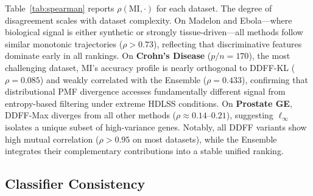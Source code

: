 \documentclass[conference]{IEEEtran}
\begin{document}
Table~\ref{tab:spearman} reports $\rho(\text{MI}, \cdot)$ for each dataset. The degree of disagreement scales with dataset complexity. On Madelon and Ebola---where biological signal is either synthetic or strongly tissue-driven---all methods follow similar monotonic trajectories ($\rho > 0.73$), reflecting that discriminative features dominate early in all rankings. On \textbf{Crohn's Disease} ($p/n=170$), the most challenging dataset, MI's accuracy profile is nearly orthogonal to DDFF-KL ($\rho = 0.085$) and weakly correlated with the Ensemble ($\rho = 0.433$), confirming that distributional PMF divergence accesses fundamentally different signal from entropy-based filtering under extreme HDLSS conditions. On \textbf{Prostate GE}, DDFF-Max diverges from all other methods ($\rho \approx 0.14$--$0.21$), suggesting $\ell_\infty$ isolates a unique subset of high-variance genes. Notably, all DDFF variants show high mutual correlation ($\rho > 0.95$ on most datasets), while the Ensemble integrates their complementary contributions into a stable unified ranking.

\begin{table}[!htb]
\centering
\caption{Spearman $\rho$ between MI accuracy-vs-$k$ profile and each other method. Lower values indicate greater disagreement in feature selection. \textbf{Bold} highlights $\rho < 0.50$.}
\label{tab:spearman}
\end{table}

\subsection{Classifier Consistency}
\end{document}
